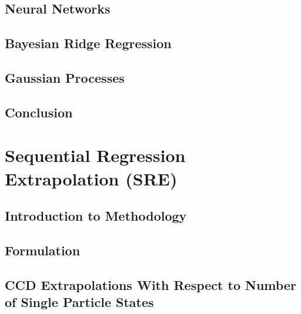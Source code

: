 \documentclass[12pt]{book}
\begin{document}
    \section{Neural Networks}
                 

    \section{Bayesian Ridge Regression}
        

    \section{Gaussian Processes}
                



    \section{Conclusion}
        

\chapter{Sequential Regression Extrapolation (SRE)}
    \section{Introduction to Methodology}
        

    \section{Formulation}
        

   
        \section{CCD Extrapolations With Respect to Number of Single Particle States}
            
\end{document}
